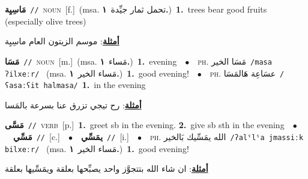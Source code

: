 \documentclass[10pt,a4paper,twoside]{article} %
\begin{document}
\begin{multicols}{2}
{\setlength\topsep{0pt}\textbf{\foreignlanguage{arabic}{مَاسِيِة}}\ {\color{gray}\texttt{//}\color{black}}\ \textsc{noun}\ [f.]\ \color{gray}(msa. \foreignlanguage{arabic}{تحمل ثمار جيِّدة}~\foreignlanguage{arabic}{\textbf{١.}})\color{black}\ \textbf{1.}~trees bear good fruits (especially olive trees)\  \begin{flushright}\color{gray}\foreignlanguage{arabic}{\textbf{\underline{\foreignlanguage{arabic}{أمثلة}}}: موسم الزيتون العام ماسِيِة}\end{flushright}\color{black}} \vspace{2mm}

{\setlength\topsep{0pt}\textbf{\foreignlanguage{arabic}{مَسَا}}\ {\color{gray}\texttt{//}\color{black}}\ \textsc{noun}\ [m.]\ \color{gray}(msa. \foreignlanguage{arabic}{مَساء}~\foreignlanguage{arabic}{\textbf{١.}})\color{black}\ \textbf{1.}~evening\ \ $\bullet$\ \ \textsc{ph.} \color{gray} \foreignlanguage{arabic}{مَسَا الخير}\color{black}\ {\color{gray}\texttt{/{\sffamily masa ʔilxeːr}/}\color{black}}\ \color{gray} (msa. \foreignlanguage{arabic}{مَساء الخير}~\foreignlanguage{arabic}{\textbf{١.}})\color{black}\ \textbf{1.}~good evening!\ \ $\bullet$\ \ \textsc{ph.} \color{gray} \foreignlanguage{arabic}{عسَاعِة هَالمَسَا}\color{black}\ {\color{gray}\texttt{/{\sffamily ʕasaːʕit halmasa}/}\color{black}}\ \textbf{1.}~in the evening\  \begin{flushright}\color{gray}\foreignlanguage{arabic}{\textbf{\underline{\foreignlanguage{arabic}{أمثلة}}}: رح تيجي تزرق عنا بسرعة بالمَسا}\end{flushright}\color{black}} \vspace{2mm}

{\setlength\topsep{0pt}\textbf{\foreignlanguage{arabic}{مَسَّى}}\ {\color{gray}\texttt{//}\color{black}}\ \textsc{verb}\ [p.]\ \textbf{1.}~greet sb in the evening.  \textbf{2.}~give sb sth in the evening\ \ $\bullet$\ \ \setlength\topsep{0pt}\textbf{\foreignlanguage{arabic}{مَسِّي}}\ {\color{gray}\texttt{//}\color{black}}\ [c.]\ \ $\bullet$\ \ \setlength\topsep{0pt}\textbf{\foreignlanguage{arabic}{يمَسِّي}}\ {\color{gray}\texttt{//}\color{black}}\ [i.]\ \ $\bullet$\ \ \textsc{ph.} \color{gray} \foreignlanguage{arabic}{الله يمَسِّيك بَالخير}\color{black}\ {\color{gray}\texttt{/{\sffamily ʔalˤlˤa jmassiːk bilxeːr}/}\color{black}}\ \color{gray} (msa. \foreignlanguage{arabic}{مَساء الخير}~\foreignlanguage{arabic}{\textbf{١.}})\color{black}\ \textbf{1.}~good evening!\  \begin{flushright}\color{gray}\foreignlanguage{arabic}{\textbf{\underline{\foreignlanguage{arabic}{أمثلة}}}: ان شاء الله بتتجوَّز واحد يصبِّحها بعلقة ويمَسِّيها بعلقة}\end{flushright}\color{black}} \vspace{2mm}


\end{multicols}
\end{document}
